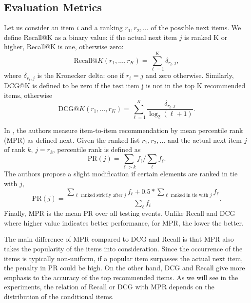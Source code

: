 \subsection{Evaluation Metrics}

Let us consider an item $i$ and a ranking $r_1,r_2,\ldots$ of the possible next items.
We define Recall@K as a binary value: if the actual next item $j$ is ranked K or higher, Recall@K is one, otherwise zero:
%
\begin{equation}
\mbox{Recall@}K(r_1,\ldots,r_K) = \sum_{\ell=1}^K \delta_{r_\ell,j},
\nonumber
\end{equation}
where $\delta_{r_\ell,j}$ is the Kronecker delta: one if $r_\ell=j$ and zero otherwise. Similarly, DCG@K is defined to be zero if the test 
item j is not in the top K recommended items, otherwise
\begin{equation}
\mbox{DCG@}K(r_1,\ldots,r_K) = \sum_{\ell=1}^K \frac{\delta_{r_\ell,j}}{\log_2(\ell+1)}.
\nonumber
\end{equation} 


In \cite{koenigstein2013towards}, the authors measure item-to-item recommendation by mean percentile rank (MPR) as defined next.
Given the ranked list $r_1,r_2,\ldots$ and the actual next item $j$ of rank $k$, $j=r_k$, percentile rank is defined as %
%
\begin{equation}
\text{PR}(j) = \sum_{\ell > k} f_\ell / \sum_\ell f_\ell.
\nonumber
\end{equation}
The authors propose a slight modification if certain elements are ranked in tie with $j$,
\begin{equation}
\text{PR}(j) = \frac{\sum_{\text{$\ell$ ranked strictly after $j$}} f_\ell + 0.5*\sum_{\text{$\ell$ ranked in tie with $j$}} f_\ell} {\sum_\ell f_\ell}.
\nonumber
\end{equation}
%
Finally, MPR is the mean PR over all testing events.
Unlike Recall and DCG where higher value indicates better performance, for MPR, the lower the better.

The main difference of MPR compared to DCG and Recall is that MPR also takes the  popularity of the items into consideration.
Since the occurrence of the items is typically non-uniform, if a popular item surpasses the actual next item, the penalty in PR could be high.
On the other hand, DCG and Recall give more emphasis to the accuracy of the top recommended items.
As we will see in the experiments, the relation of Recall or DCG with MPR depends on the distribution of the conditional items. 

